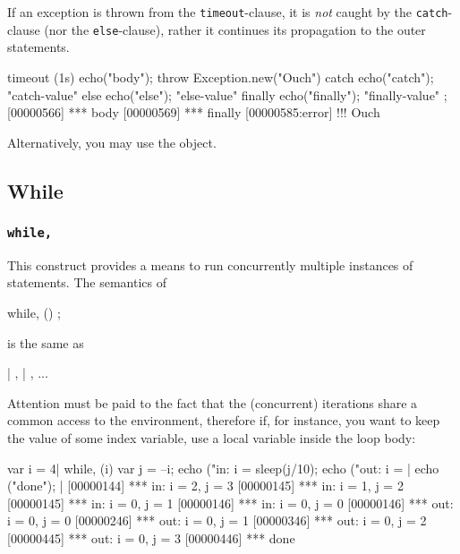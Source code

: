If an exception is thrown from the \lstinline|timeout|-clause, it is
\emph{not} caught by the \lstinline|catch|-clause (nor the
\lstinline|else|-clause), rather it continues its propagation to the outer
statements.

\begin{urbiscript}
timeout (1s)  { echo("body"); throw Exception.new("Ouch") }
catch         { echo("catch"); "catch-value" }
else          { echo("else"); "else-value" }
finally       { echo("finally"); "finally-value" };
[00000566] *** body
[00000569] *** finally
[00000585:error] !!! Ouch
\end{urbiscript}

Alternatively, you may use the  object.

\subsection{While}
\subsubsection{\lstinline|while,|}
\label{sec:lang:while:comma}
\experimentalremoved{}

This construct provides a means to run concurrently multiple instances
of statements.  The semantics of

\begin{urbiunchecked}
while, ()
  ;
\end{urbiunchecked}

\noindent
is the same as

\begin{urbiunchecked}
 |  ,  |  , ...
\end{urbiunchecked}

Attention must be paid to the fact that the (concurrent) iterations
share a common access to the environment, therefore if, for instance,
you want to keep the value of some index variable, use a local
variable inside the loop body:

\begin{urbiscript}[firstnumber=1]
{
  var i = 4|
  while, (i)
  {
    var j = --i;
    echo ("in: i = %
    sleep(j/10);
    echo ("out: i = %
  }|
  echo ("done");
}|
[00000144] *** in: i = 2, j = 3
[00000145] *** in: i = 1, j = 2
[00000145] *** in: i = 0, j = 1
[00000146] *** in: i = 0, j = 0
[00000146] *** out: i = 0, j = 0
[00000246] *** out: i = 0, j = 1
[00000346] *** out: i = 0, j = 2
[00000445] *** out: i = 0, j = 3
[00000446] *** done
\end{urbiscript}

